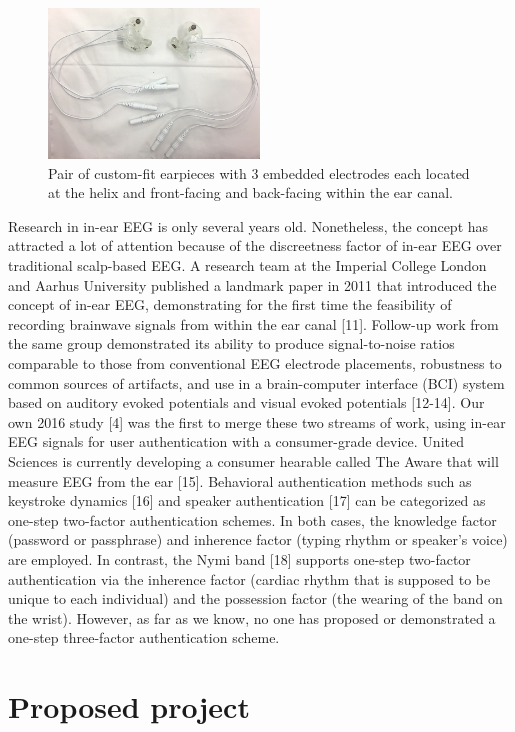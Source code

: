 \documentclass[11pt]{article}
\begin{document}
\begin{figure}[h]
\centering
\includegraphics[width=0.5\textwidth]{2EEEG.jpg}
\caption{Pair of custom-fit earpieces with 3 embedded electrodes each located at the helix and front-facing
and back-facing within the ear canal.}
\end{figure}

Research in in-ear EEG is only several years old. Nonetheless, the concept has
attracted a lot of attention because of the discreetness factor of in-ear EEG over
traditional scalp-based EEG. A research team at the Imperial College London
and Aarhus University published a landmark paper in 2011 that introduced the
concept of in-ear EEG, demonstrating for the first time the feasibility of recording
brainwave signals from within the ear canal [11]. Follow-up work from the same
group demonstrated its ability to produce signal-to-noise ratios comparable to
those from conventional EEG electrode placements, robustness to common
sources of artifacts, and use in a brain-computer interface (BCI) system based on
auditory evoked potentials and visual evoked potentials [12-14]. Our own 2016 study
[4] was the first to merge these two streams of work, using in-ear EEG signals for
user authentication with a consumer-grade device. United Sciences is currently
developing a consumer hearable called The Aware that will measure EEG from the ear [15].
Behavioral authentication methods such as keystroke dynamics [16] and speaker
authentication [17] can be categorized as one-step two-factor authentication
schemes. In both cases, the knowledge factor (password or passphrase) and
inherence factor (typing rhythm or speaker’s voice) are employed. In contrast, the
Nymi band [18] supports one-step two-factor authentication via the inherence
factor (cardiac rhythm that is supposed to be unique to each individual) and the
possession factor (the wearing of the band on the wrist). However, as far as we
know, no one has proposed or demonstrated a one-step three-factor
authentication scheme.

\section{Proposed project}
\label{sec:orgb73667f}
\end{document}
